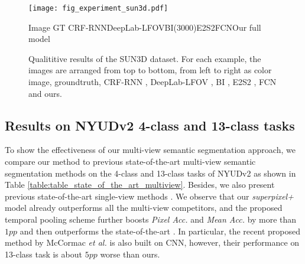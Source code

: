 \begin{figure*}[!t]
\begin{center}
   \texttt{[image: fig\_experiment\_sun3d.pdf]}
   \end{center}
   \scriptsize
   \hspace{2.4cm} Image
   \hspace{1.1cm}GT
   \hspace{0.95cm}CRF-RNN\hspace{0.4cm}DeepLab-LFOV\hspace{0.48cm}BI(3000)\hspace{1.01cm}E2S2\hspace{1.16cm}FCN\hspace{0.77cm}Our full model
   \caption{Qualititive results of the SUN3D dataset.
   For each example, the images are arranged from top to bottom, from left to right as color image, groundtruth, CRF-RNN \cite{crfasrnn_iccv2015}, DeepLab-LFOV \cite{chen2016deeplab}, BI \cite{raghudeep2015spCNN}, E2S2 \cite{region_end2end2016eccv}, FCN \cite{long2015fully} and ours.}
\label{fig:sun3d}
\end{figure*}

\subsection{Results on NYUDv2 4-class and 13-class tasks}
\vspace{-0.1cm}
To show the effectiveness of our multi-view semantic segmentation approach, we compare our method to previous state-of-the-art multi-view semantic segmentation methods \cite{couprie2013indoor,hermans2014dense,stuckler2015dense,SemanticFusion} on the 4-class and 13-class tasks of NYUDv2 as shown in Table \ref{table:table_state_of_the_art_multiview}.
Besides, we also present previous state-of-the-art single-view methods  \cite{david2015multiscale, specificfeature2016eccv,Unsupervised_RGBD_segmentation}.
We observe that our \textit{superpixel+} model already outperforms all the multi-view competitors, and the proposed temporal pooling scheme further boosts \textit{Pixel Acc.} and \textit{Mean Acc.} by more than $1pp$ and then outperforms the state-of-the-art \cite{david2015multiscale}.
In particular, the recent proposed method by McCormac \emph{et al.} \cite{SemanticFusion} is also built on CNN, however, their performance on 13-class task is about $5pp$ worse than ours.

